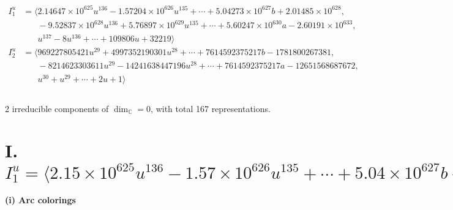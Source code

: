 \documentclass[1p]{elsarticle_modified}
\theoremstyle{definition}
\begin{document}
\begin{align*}
I^u_{1}&=\langle 
2.14647\times10^{625} u^{136}-1.57204\times10^{626} u^{135}+\cdots+5.04273\times10^{627} b+2.01485\times10^{628},\\
\phantom{I^u_{1}}&\phantom{= \langle  }-9.52837\times10^{628} u^{136}+5.76897\times10^{629} u^{135}+\cdots+5.60247\times10^{630} a-2.60191\times10^{633},\\
\phantom{I^u_{1}}&\phantom{= \langle  }u^{137}-8 u^{136}+\cdots+109806 u+32219\rangle \\
I^u_{2}&=\langle 
969227805421 u^{29}+4997352190301 u^{28}+\cdots+7614592375217 b-1781800267381,\\
\phantom{I^u_{2}}&\phantom{= \langle  }-8214623303611 u^{29}-14241638447196 u^{28}+\cdots+7614592375217 a-12651568687672,\\
\phantom{I^u_{2}}&\phantom{= \langle  }u^{30}+u^{29}+\cdots+2 u+1\rangle \\
\\
\end{align*}
\raggedright * 2 irreducible components of $\dim_{\mathbb{C}}=0$, with total 167 representations.\\
\newpage
\renewcommand{\arraystretch}{1}
\centering \section*{I. $I^u_{1}= \langle 2.15\times10^{625} u^{136}-1.57\times10^{626} u^{135}+\cdots+5.04\times10^{627} b+2.01\times10^{628},\;-9.53\times10^{628} u^{136}+5.77\times10^{629} u^{135}+\cdots+5.60\times10^{630} a-2.60\times10^{633},\;u^{137}-8 u^{136}+\cdots+109806 u+32219 \rangle$}
\flushleft \textbf{(i) Arc colorings}\\
\end{document}

